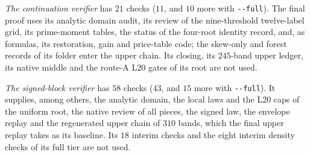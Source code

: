 \emph{The continuation verifier} 
has $21$ checks ($11$, and $10$ more with \texttt{-{}-full}). The final proof
uses its analytic domain audit, its review of the nine-threshold twelve-label
grid, its prime-moment tables, the status of the four-root identity record,
and, as formulas, its restoration, gain and price-table code; the skew-only
and forest records of its folder enter the upper chain. Its closing, its
$245$-band upper ledger, its native middle and the route-A L20 gates of its
root are not used.

\emph{The signed-block verifier} 
has $58$ checks ($43$, and $15$ more with \texttt{-{}-full}). It supplies, among
others, the analytic domain, the local laws and the L20 caps of the uniform
root, the native review of all pieces, the signed law, the envelope replay and
the regenerated upper chain of $310$ bands, which the final upper replay takes
as its baseline. Its $18$ interim checks and the eight interim density checks
of its full tier are not used.

